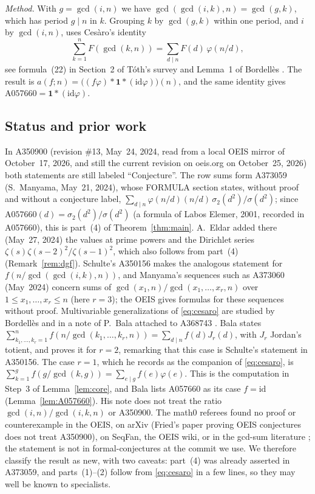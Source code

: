 \documentclass[11pt]{amsart}
\theoremstyle{plain}
\theoremstyle{definition}
\newcommand{\idf}{\mathrm{id}}
\newcommand{\A}[1]{\mathrm{A#1}}
\begin{document}
\emph{Method.} With $g=\gcd(i,n)$ we have $\gcd(\gcd(i,k),n)=\gcd(g,k)$, which has period $g\mid n$ in $k$. Grouping $k$ by $\gcd(g,k)$ within one period, and $i$ by $\gcd(i,n)$, uses Ces\`aro's identity
\begin{equation}\label{eq:cesaro}
  \sum_{k=1}^{n}F(\gcd(k,n))=\sum_{d\mid n}F(d)\,\varphi(n/d),
\end{equation}
see formula~(22) in Section~2 of T\'oth's survey \cite{To} and Lemma~1 of Bordell\`es \cite{Bo}. The result is $a(f;n)=\bigl((f\varphi)*\mathbf 1*(\idf\varphi)\bigr)(n)$, and the same identity gives $\A{057660}=\mathbf 1*(\idf\varphi)$.

\subsection*{Status and prior work}
In A350900 (revision \#13, May~24, 2024, read from a local OEIS mirror of October~17, 2026, and still the current revision on oeis.org on October~25, 2026) both statements are still labeled ``Conjecture''.
The row sums form A373059 \cite{A373059} (S.~Manyama, May~21, 2024), whose FORMULA section states, without proof and without a conjecture label, $\sum_{d\mid n}\varphi(n/d)(n/d)\,\sigma_2(d^2)/\sigma(d^2)$; since $\A{057660}(d)=\sigma_2(d^2)/\sigma(d^2)$ (a formula of Labos Elemer, 2001, recorded in A057660), this is part~(4) of Theorem~\ref{thm:main}. A.~Eldar added there (May~27, 2024) the values at prime powers and the Dirichlet series $\zeta(s)\zeta(s-2)^2/\zeta(s-1)^2$, which also follows from part~(4) (Remark~\ref{rem:dgf}).
Schulte's A350156 \cite{A350156} makes the analogous statement for $f(n/\gcd(\gcd(i,k),n))$, and Manyama's sequences such as A373060 \cite{A373060} (May~2024) concern sums of $\gcd(x_1,n)/\gcd(x_1,\dots,x_r,n)$ over $1\le x_1,\dots,x_r\le n$ (here $r=3$); the OEIS gives formulas for these sequences without proof.
Multivariable generalizations of \eqref{eq:cesaro} are studied by Bordell\`es \cite{Bo} and in a note of P.~Bala attached to A368743 \cite{Bala}. Bala states $\sum_{k_1,\dots,k_r=1}^{n}f(n/\gcd(k_1,\dots,k_r,n))=\sum_{d\mid n}f(d)J_r(d)$, with $J_r$ Jordan's totient, and proves it for $r=2$, remarking that this case is Schulte's statement in A350156. The case $r=1$, which he records as the companion of \eqref{eq:cesaro}, is $\sum_{k=1}^{g}f(g/\gcd(k,g))=\sum_{e\mid g}f(e)\varphi(e)$. This is the computation in Step~3 of Lemma~\ref{lem:core}, and Bala lists A057660 as its case $f=\idf$ (Lemma~\ref{lem:A057660}). His note does not treat the ratio $\gcd(i,n)/\gcd(i,k,n)$ or A350900.
The math0 referees found no proof or counterexample in the OEIS, on arXiv (Fried's paper \cite{Fr} proving OEIS conjectures does not treat A350900), on SeqFan, the OEIS wiki, or in the gcd-sum literature \cite{To,Bo,Bala}; the statement is not in formal-conjectures \cite{FC} at the commit we use.
We therefore classify the result as new, with two caveats: part~(4) was already asserted in A373059, and parts~(1)--(2) follow from \eqref{eq:cesaro} in a few lines, so they may well be known to specialists.
\end{document}
